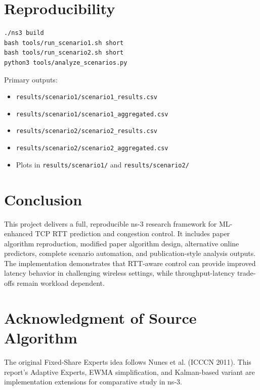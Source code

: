 \documentclass[11pt,a4paper]{article}
\begin{document}
\section{Reproducibility}
\begin{verbatim}
./ns3 build
bash tools/run_scenario1.sh short
bash tools/run_scenario2.sh short
python3 tools/analyze_scenarios.py
\end{verbatim}

Primary outputs:
\begin{itemize}
    \item \texttt{results/scenario1/scenario1\_results.csv}
    \item \texttt{results/scenario1/scenario1\_aggregated.csv}
    \item \texttt{results/scenario2/scenario2\_results.csv}
    \item \texttt{results/scenario2/scenario2\_aggregated.csv}
    \item Plots in \texttt{results/scenario1/} and \texttt{results/scenario2/}
\end{itemize}

\section{Conclusion}
This project delivers a full, reproducible ns-3 research framework for ML-enhanced TCP RTT prediction and congestion control. It includes paper algorithm reproduction, modified paper algorithm design, alternative online predictors, complete scenario automation, and publication-style analysis outputs. The implementation demonstrates that RTT-aware control can provide improved latency behavior in challenging wireless settings, while throughput-latency trade-offs remain workload dependent.

\section*{Acknowledgment of Source Algorithm}
The original Fixed-Share Experts idea follows Nunes et al. (ICCCN 2011). This report's Adaptive Experts, EWMA simplification, and Kalman-based variant are implementation extensions for comparative study in ns-3.
\end{document}
